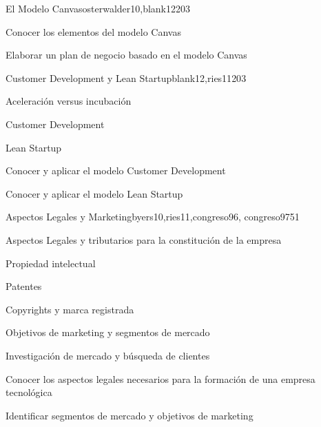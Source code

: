 \begin{syllabus}
\begin{unit}{El Modelo Canvas}{osterwalder10,blank12}{20}{3}
   \begin{unitgoals}
      \item Conocer los elementos del modelo Canvas
      \item Elaborar un plan de negocio basado en el modelo Canvas 
    \end{unitgoals}
\end{unit}

\begin{unit}{Customer Development y Lean Startup}{blank12,ries11}{20}{3}
	\begin{topics}
      \item Aceleración versus incubación  
      \item Customer Development
      \item Lean Startup 
   \end{topics}

   \begin{unitgoals}
      \item Conocer y aplicar el modelo Customer Development
      \item Conocer y aplicar el modelo Lean Startup
    \end{unitgoals}
\end{unit}

\begin{unit}{Aspectos Legales y Marketing}{byers10,ries11,congreso96, congreso97}{5}{1}
	\begin{topics}
	  \item Aspectos Legales y tributarios para la constitución de la empresa
      \item Propiedad intelectual
      \item Patentes
      \item Copyrights y marca registrada
      \item Objetivos de marketing  y segmentos de mercado
      \item Investigación de mercado y búsqueda de clientes
   \end{topics}

   \begin{unitgoals}
      \item Conocer los aspectos legales necesarios para la formación de una empresa tecnológica
      \item Identificar segmentos de mercado y objetivos de marketing    
   \end{unitgoals}
\end{unit}


\end{syllabus}
